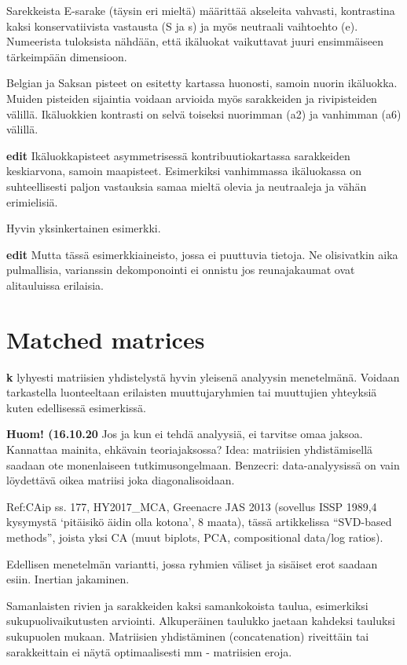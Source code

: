 \documentclass[
  finnish,
]{book}
\begin{document}
Sarekkeista E-sarake (täysin eri mieltä) määrittää akseleita vahvasti,
kontrastina kaksi konservatiivista vastausta (S ja s) ja myös neutraali
vaihtoehto (e). Numeerista tuloksista nähdään, että ikäluokat
vaikuttavat juuri ensimmäiseen tärkeimpään dimensioon.

Belgian ja Saksan pisteet on esitetty kartassa huonosti, samoin nuorin
ikäluokka. Muiden pisteiden sijaintia voidaan arvioida myös sarakkeiden
ja rivipisteiden välillä. Ikäluokkien kontrasti on selvä toiseksi
nuorimman (a2) ja vanhimman (a6) välillä.

\textbf{edit} Ikäluokkapisteet asymmetrisessä kontribuutiokartassa
sarakkeiden keskiarvona, samoin maapisteet. Esimerkiksi vanhimmassa
ikäluokassa on suhteellisesti paljon vastauksia samaa mieltä olevia ja
neutraaleja ja vähän erimielisiä.

Hyvin yksinkertainen esimerkki.

\textbf{edit} Mutta tässä esimerkkiaineisto, jossa ei puuttuvia tietoja.
Ne olisivatkin aika pulmallisia, varianssin dekomponointi ei onnistu jos
reunajakaumat ovat alitauluissa erilaisia.

\hypertarget{matched-matrices}{%
\section{Matched matrices}\label{matched-matrices}}

\textbf{k} lyhyesti matriisien yhdistelystä hyvin yleisenä analyysin
menetelmänä. Voidaan tarkastella luonteeltaan erilaisten muuttujaryhmien
tai muuttujien yhteyksiä kuten edellisessä esimerkissä.

\textbf{Huom! (16.10.20} Jos ja kun ei tehdä analyysiä, ei tarvitse omaa
jaksoa. Kannattaa mainita, ehkävain teoriajaksossa? Idea: matriisien
yhdistämisellä saadaan ote monenlaiseen tutkimusongelmaan. Benzecri:
data-analyysissä on vain löydettävä oikea matriisi joka
diagonalisoidaan.

Ref:CAip ss. 177, HY2017\_MCA, Greenacre JAS 2013 (sovellus ISSP 1989,4
kysymystä `pitäisikö äidin olla kotona', 8 maata), tässä artikkelissa
``SVD-based methods'', joista yksi CA (muut biplots, PCA, compositional
data/log ratios).

Edellisen menetelmän variantti, jossa ryhmien väliset ja sisäiset erot
saadaan esiin. Inertian jakaminen.

Samanlaisten rivien ja sarakkeiden kaksi samankokoista taulua,
esimerkiksi sukupuolivaikutusten arviointi. Alkuperäinen taulukko
jaetaan kahdeksi tauluksi sukupuolen mukaan. Matriisien yhdistäminen
(concatenation) riveittäin tai sarakkeittain ei näytä optimaalisesti mm
- matriisien eroja.
\end{document}

